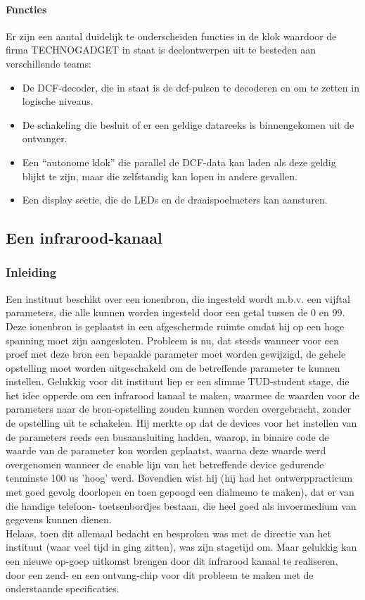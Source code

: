 \paragraph{Functies}

Er zijn een aantal duidelijk te onderscheiden functies in de klok 
waardoor de firma TECHNOGADGET in staat is deelontwerpen uit te besteden 
aan verschillende teams:
\begin{itemize}
\item
De DCF-decoder, die in staat is de dcf-pulsen te decoderen en om te zetten in logische niveaus.
\item
De schakeling die besluit of er een geldige datareeks is binnengekomen uit 
de ontvanger.
\item
Een ``autonome klok'' die parallel de DCF-data kan laden als deze geldig blijkt te zijn, maar die zelfstandig kan lopen in andere gevallen.
\item
Een display sectie, die de LEDs en de draaispoelmeters kan aansturen.
\end{itemize}

\subsection{Een infrarood-kanaal}
\subsubsection{Inleiding}
Een instituut beschikt over een ionenbron, die ingesteld wordt m.b.v.
een vijftal parameters, die alle kunnen worden ingesteld door een
getal tussen de 0 en 99. Deze ionenbron is geplaatst in een afgeschermde
ruimte omdat hij op een hoge spanning moet zijn aangesloten.
Probleem is nu, dat steeds wanneer voor een proef met deze bron een
bepaalde parameter moet worden gewijzigd, de gehele opstelling moet worden
uitgeschakeld om de betreffende parameter te kunnen instellen.
Gelukkig voor dit instituut liep er een slimme TUD-student stage, die
het idee opperde om een infrarood kanaal te maken, waarmee de waarden voor
de parameters naar de bron-opstelling zouden kunnen worden overgebracht,
zonder de opstelling uit te schakelen.
Hij merkte op dat de devices voor het instellen van de parameters
reeds een busaansluiting hadden, waarop, in binaire code de waarde van
de parameter kon worden geplaatst, waarna deze waarde werd overgenomen wanneer
de enable lijn van het betreffende device gedurende tenminste
100 us 'hoog' werd.
Bovendien wist hij (hij had het ontwerppracticum met goed gevolg doorlopen
en toen gepoogd een dialmemo te maken), dat er van die handige telefoon-
toetsenbordjes bestaan, die heel goed als invoermedium van gegevens kunnen
dienen.\\
Helaas, toen dit allemaal bedacht en besproken was met de directie van het
instituut (waar veel tijd in ging zitten), was zijn stagetijd om.
Maar gelukkig kan een nieuwe op-goep uitkomst brengen door dit
infrarood kanaal te realiseren, door een zend- en een ontvang-chip
voor dit probleem te maken met de onderstaande specificaties.
